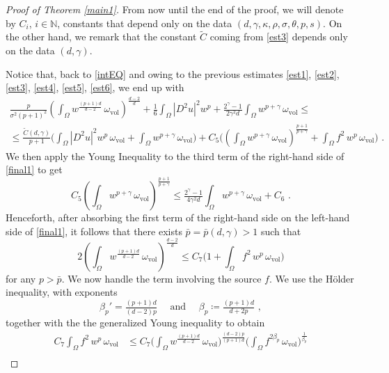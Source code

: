 \documentclass[10pt, a4paper, reqno, oneside]{amsart}
\theoremstyle{plain}
\theoremstyle{definition}
\theoremstyle{plain}
\theoremstyle{definition}
\theoremstyle{plain}
\renewcommand{\=}{:=}
\begin{document}
\begin{proof}[Proof of Theorem \ref{main1}]
From now until the end of the proof, we will denote by $C_i$, $i \in \mathbb{N}$, constants that depend only on the data $(d,\gamma,\kappa,\rho,\sigma,\theta,p,s)$. On the other hand, we remark that the constant $\tilde{C}$ coming from \eqref{est3} depends only on the data $(d,\gamma)$.

Notice that, back to \eqref{intEQ} and owing to the previous estimates \eqref{est1}, \eqref{est2}, \eqref{est3}, \eqref{est4}, \eqref{est5}, \eqref{est6}, we end up with
\begin{multline} \label{final1}
\tfrac{p}{\sigma^2(p+1)^2}\left(\int_\Omega w^\frac{(p+1)d}{d-2}\,\omega_{\mathrm{vol}}\right)^{\frac{d-2}d}
+\tfrac16\int_{\Omega}|D^2u|^2w^{p} +\tfrac{2^{\gamma}-1}{2\gamma^2d} \int_\Omega w^{p+\gamma}\,\omega_{\mathrm{vol}}
\leq \\
\leq \frac{\tilde{C}(d,\gamma)}{p+1} \bigg(\int_\Omega |D^2u|^2w^p\,\omega_{\mathrm{vol}}
+\int_\Omega w^{p+\gamma}\,\omega_{\mathrm{vol}}\bigg)
+C_5\bigg(\left(\int_\Omega w^{p+\gamma}\,\omega_{\mathrm{vol}}\right)^{\frac{p+1}{p+\gamma}}
+\int_\Omega f^2\,w^p\,\omega_{\mathrm{vol}}\bigg) \,\, .
\end{multline}
We then apply the Young Inequality to the third term of the right-hand side of \eqref{final1} to get
$$
C_5\left(\int_\Omega w^{p+\gamma}\,\omega_{\mathrm{vol}}\right)^{\frac{p+1}{p+\gamma}}\leq \tfrac{2^{\gamma}-1}{4\gamma^2d} \int_\Omega w^{p+\gamma}\,\omega_{\mathrm{vol}}+C_6 \,\, .
$$
Henceforth, after absorbing the first term of the right-hand side on the left-hand side of \eqref{final1}, it follows that there exists $\bar{p}=\bar{p}(d,\gamma)>1$ such that \begin{equation} \label{final2}
2\left(\int_\Omega w^\frac{(p+1)d}{d-2}\,\omega_{\mathrm{vol}}\right)^{\frac{d-2}d} \leq C_7\bigg(1+\int_\Omega f^2\,w^p\,\omega_{\mathrm{vol}}\bigg)
\end{equation}
for any $p>\bar{p}$. We now handle the term involving the source $f$. We use the H\"older inequality, with exponents
$$
\beta_p'=\tfrac{(p+1)d}{(d-2)p} \quad \text{ and } \quad \beta_p \coloneqq \tfrac{(p+1)d}{d+2p} \,\, ,
$$
together with the the generalized Young inequality to obtain
\begin{equation} \label{holderfin1} \begin{aligned}
C_7 \int_\Omega f^2\,w^p\,\omega_{\mathrm{vol}} &\leq C_7 \bigg(\int_\Omega w^{\frac{(p+1)d}{d-2}}\,\omega_{\mathrm{vol}}\bigg)^{\frac{(d-2)p}{(p+1)d}} \bigg(\int_\Omega f^{2\beta_p}\,\omega_{\mathrm{vol}}\bigg)^{\frac1{\beta_p}} \\

\end{aligned}
\end{equation}
\end{proof}
\end{document}
